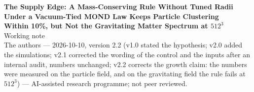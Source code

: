 \documentclass[10pt]{article}
\begin{document}
\begin{center}
{\Large\bfseries The Supply Edge: A Mass-Conserving Rule Without Tuned Radii\\ Under a Vacuum-Tied MOND Law Keeps Particle Clustering\\ Within 10\%, but Not the Gravitating Matter Spectrum at $512^3$}\\[4pt]
{\large Working note}\\[6pt]
{\small The authors --- 2026-10-10, version 2.2 (v1.0 stated the hypothesis; v2.0 added the simulations; v2.1 corrected the wording of the control and the inputs after an internal audit, numbers unchanged; v2.2 corrects the growth claim: the numbers were measured on the particle field, and on the gravitating field the rule fails at $512^3$) --- AI-assisted research programme; not peer reviewed.}
\end{center}
\end{document}
